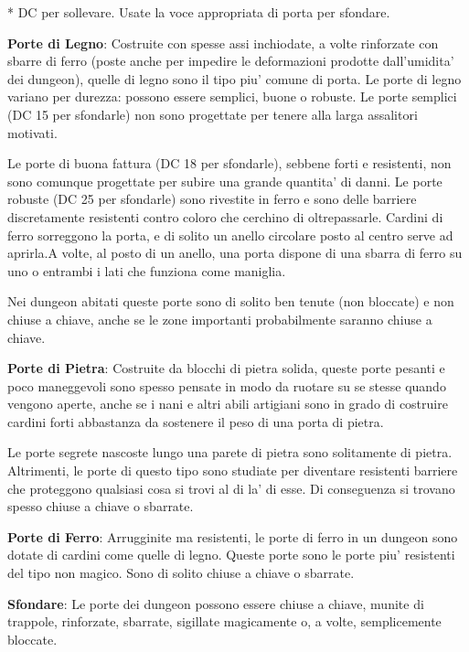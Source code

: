 \documentclass[a4paper,11pt,twoside,openany]{book}
\begin{document}
{		{*} DC per sollevare. Usate la voce appropriata di porta per sfondare.
		
		\bigskip
		
		\textbf{Porte di Legno}: Costruite con spesse assi inchiodate, a volte rinforzate con sbarre di ferro (poste anche per impedire le deformazioni prodotte dall'umidita' dei dungeon), quelle di legno sono il tipo piu' comune di porta. Le porte di legno variano per durezza: possono essere semplici, buone o robuste. Le porte semplici (DC 15 per sfondarle) non sono progettate per tenere alla larga assalitori motivati.
		
		Le porte di buona fattura (DC 18 per sfondarle), sebbene forti e resistenti, non sono comunque progettate per subire una grande quantita' di danni. Le porte robuste (DC 25 per sfondarle) sono rivestite in ferro e sono delle barriere discretamente resistenti contro coloro che cerchino di oltrepassarle. Cardini di ferro sorreggono la porta, e di solito un anello circolare posto al centro serve ad aprirla.A volte, al posto di un anello, una porta dispone di una sbarra di ferro su uno o entrambi i lati che funziona come maniglia.
		
		Nei dungeon abitati queste porte sono di solito ben tenute (non bloccate) e non chiuse a chiave, anche se le zone importanti probabilmente saranno chiuse a chiave.
		
		\textbf{Porte di Pietra}: Costruite da blocchi di pietra solida, queste porte pesanti e poco maneggevoli sono spesso pensate in modo da ruotare su se stesse quando vengono aperte, anche se i nani e altri abili artigiani sono in grado di costruire cardini forti abbastanza da sostenere il peso di una porta di pietra.
		
		Le porte segrete nascoste lungo una parete di pietra sono solitamente di pietra. Altrimenti, le porte di questo tipo sono studiate per diventare resistenti barriere che proteggono qualsiasi cosa si trovi al di la' di esse. Di conseguenza si trovano spesso chiuse a chiave o sbarrate.
		
		\textbf{Porte di Ferro}: Arrugginite ma resistenti, le porte di ferro in un dungeon sono dotate di cardini come quelle di legno. Queste porte sono le porte piu' resistenti del tipo non magico. Sono di solito chiuse a chiave o sbarrate.
		
		\textbf{Sfondare}: Le porte dei dungeon possono essere chiuse a chiave, munite di trappole, rinforzate, sbarrate, sigillate magicamente o, a volte, semplicemente bloccate.
		
}
\end{document}
